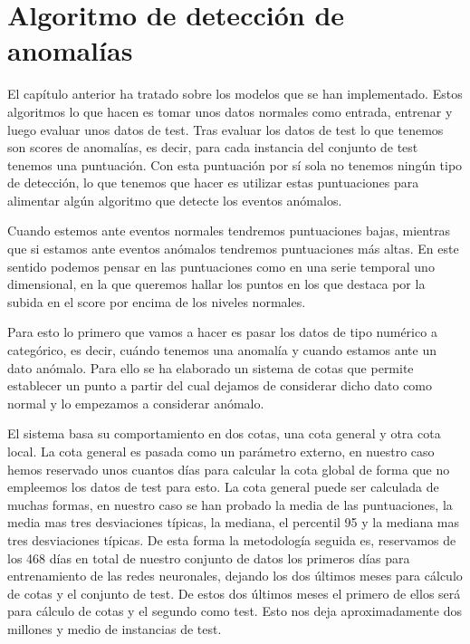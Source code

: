 \chapter{Algoritmo de detección de anomalías}
\label{chapter:algoritmo-anomalias}

El capítulo anterior ha tratado sobre los modelos que se han implementado. Estos algoritmos lo que hacen es tomar unos datos normales como entrada, entrenar y luego evaluar unos datos de test. Tras evaluar los datos de test lo que tenemos son scores de anomalías, es decir, para cada instancia del conjunto de test tenemos una puntuación. Con esta puntuación por sí sola no tenemos ningún tipo de detección, lo que tenemos que hacer es utilizar estas puntuaciones para alimentar algún algoritmo que detecte los eventos anómalos.

Cuando estemos ante eventos normales tendremos puntuaciones bajas, mientras que si estamos ante eventos anómalos tendremos puntuaciones más altas. En este sentido podemos pensar en las puntuaciones como en una serie temporal uno dimensional, en la que queremos hallar los puntos en los que destaca por la subida en el score por encima de los niveles normales.

Para esto lo primero que vamos a hacer es pasar los datos de tipo numérico a categórico, es decir, cuándo tenemos una anomalía y cuando estamos ante un dato anómalo. Para ello se ha elaborado un sistema de cotas que permite establecer un punto a partir del cual dejamos de considerar dicho dato como normal y lo empezamos a considerar anómalo.

El sistema basa su comportamiento en dos cotas, una cota general y otra cota local. La cota general es pasada como un parámetro externo, en nuestro caso hemos reservado unos cuantos días para calcular la cota global de forma que no empleemos los datos de test para esto. La cota general puede ser calculada de muchas formas, en nuestro caso se han probado la media de las puntuaciones, la media mas tres desviaciones típicas, la mediana, el percentil 95 y la mediana mas tres desviaciones típicas. De esta forma la metodología seguida es, reservamos de los 468 días en total de nuestro conjunto de datos los primeros días para entrenamiento de las redes neuronales, dejando los dos últimos meses para cálculo de cotas y el conjunto de test. De estos dos últimos meses el primero de ellos será para cálculo de cotas y el segundo como test. Esto nos deja aproximadamente dos millones y medio de instancias de test.

